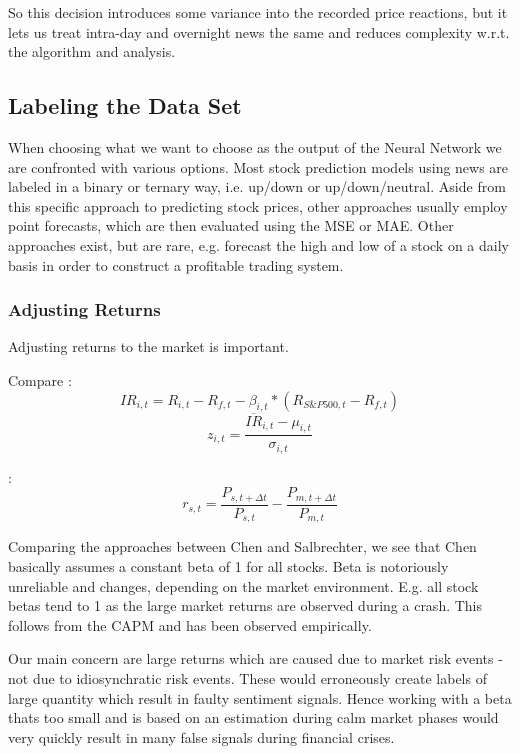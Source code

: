 \documentclass[12pt,a4paper]{article}
\begin{document}
	
	So this decision introduces some variance into the recorded price reactions, but it lets us treat intra-day and overnight news the same and reduces complexity w.r.t. the algorithm and analysis.
	
	\subsection{Labeling the Data Set}
	When choosing what we want to choose as the output of the Neural Network we are confronted with various options. 
	Most stock prediction models using news are labeled in a binary or ternary way, i.e. up/down or up/down/neutral.
	Aside from this specific approach to predicting stock prices,
	other approaches usually employ point forecasts, which are then evaluated using the \ac{MSE} or \ac{MAE}.
	Other approaches exist, but are rare, e.g. \cite{martinez_artificial_2009} forecast the high and low of a stock on a daily basis in order to construct a profitable trading system.
	
	
	\subsubsection{Adjusting Returns}
	Adjusting returns to the market is important.
	
	Compare \cite{salbrechter_financial_2021}:
	$$
	IR_{i, t}=R_{i, t}-R_{f, t}-\beta_{i, t} *\left(R_{S \& P 500, t}-R_{f, t}\right)
	$$
	$$
	z_{i, t}=\frac{\overline{I R}_{i, t}-\mu_{i, t}}{\sigma_{i, t}}
	$$
	
	\cite{chen_stock_2021}:
	$$
	r_{s, t}=\frac{P_{s, t+\Delta t}}{P_{s, t}}-\frac{P_{m, t+\Delta t}}{P_{m, t}}
	$$
	
	Comparing the approaches between Chen and Salbrechter, we see that Chen basically assumes a constant beta of 1 for all stocks. 
	Beta is notoriously unreliable and changes, depending on the market environment.
	E.g. all stock betas tend to 1 as the large market returns are observed during a crash.
	This follows from the CAPM and has been observed empirically.
	
	Our main concern are large returns which are caused due to market risk events - not due to idiosynchratic risk events.
	These would erroneously create labels of large quantity which result in faulty sentiment signals.
	Hence working with a beta thats too small and is based on an estimation during calm market phases would very quickly result in many false signals during financial crises.
	
\end{document}
